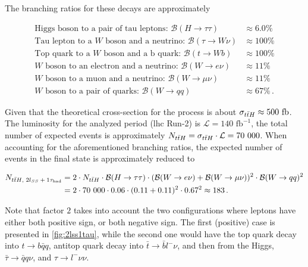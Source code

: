 The branching ratios for these decays are approximately

\begin{align*}
    \text{Higgs boson to a pair of tau leptons: }\mathcal{B}(H \rightarrow \tau\tau)    & \approx 6.0\%   \\
    \text{Tau lepton to a $W$ boson and a neutrino: }\mathcal{B}(\tau \rightarrow W\nu) & \approx 100\%   \\
    \text{Top quark to a $W$ boson and a b quark: }\mathcal{B}(t \rightarrow Wb)        & \approx 100\%   \\
    \text{$W$ boson to an electron and a neutrino: }\mathcal{B}(W \rightarrow e\nu)     & \approx 11\%    \\
    \text{$W$ boson to a muon and a neutrino: }\mathcal{B}(W \rightarrow \mu\nu)        & \approx 11\%    \\
    \text{$W$ boson to a pair of quarks: }\mathcal{B}(W \rightarrow qq)                 & \approx 67\%\,.
\end{align*}

Given that the theoretical cross-section for the \tth process is about $\sigma_{t\bar{t}H} \approx 500 \text{ fb}$. The
luminosity for the analyzed period (\gls{lhc} Run-2) is ${\mathcal{L} = 140 \text{ fb}^{-1}}$, the total number of expected
\tth events is approximately ${N_\tth = \sigma_\tth \cdot \mathcal{L} = 70\ 000}$.  When accounting for the
aforementioned branching ratios, the expected number of \tth events in the \lss final state is approximately reduced to

\begin{align*}
    N_{\text{\ensuremath{{t\bar{t}H}}, \ensuremath{2l_{SS}+1\tau_\text{had}}}} & = 2 \cdot N_{t\bar{t}H} \cdot
    \mathcal{B}(H \rightarrow \tau\tau) \cdot
    (\mathcal{B}(W \rightarrow e\nu) + \mathcal{B}(W \rightarrow \mu\nu))^2 \cdot
    \mathcal{B}(W \rightarrow qq)^2                                                                        \\
                          & = 2 \cdot 70\ 000 \cdot 0.06 \cdot (0.11 + 0.11)^2 \cdot 0.67^2 \approx 183\,.
\end{align*}

Note that factor $2$ takes into account the two configurations where leptons have either both positive sign, or both negative sign. The
first (positive) case is presented in \autoref{fig:2lss1tau}, while the second one would have the top quark decay
into $t \rightarrow b\bar{q}q$, antitop quark decay into $\bar{t} \rightarrow \bar{b}l^-\nu$, and then from the Higgs,
$\bar{\tau} \rightarrow \bar{q}q\nu$, and $\tau \rightarrow l^-\nu\nu$.

